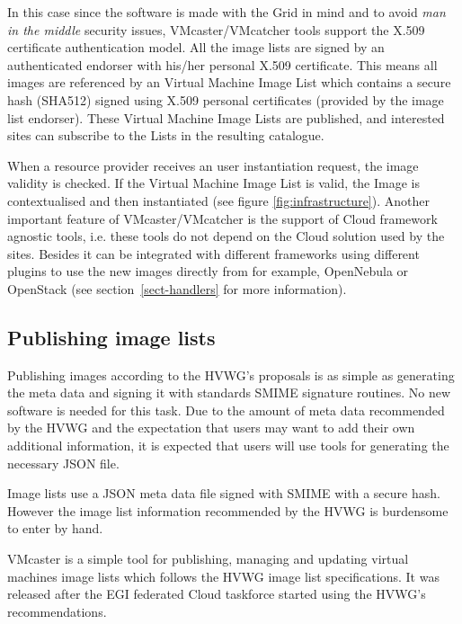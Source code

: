 \documentclass{cai}
\begin{document}
In this case since the software is made with the Grid in mind and to avoid {\it man in the middle} security issues, VMcaster/VMcatcher tools support the X.509 certificate authentication model.
All the image lists are signed by an authenticated endorser with his/her personal X.509 certificate. 
This means all images are referenced by an Virtual Machine Image List which contains a secure hash (SHA512) signed using X.509 personal certificates (provided by the image list endorser). 
These Virtual Machine Image Lists are published, and interested sites can subscribe to the Lists in the resulting catalogue. 

When a resource provider receives an user instantiation request, the image validity is checked. If the Virtual Machine Image List is valid, the Image is contextualised and then instantiated (see figure \ref{fig:infrastructure}). 
Another important feature of VMcaster/VMcatcher is the support of Cloud framework agnostic tools, i.e. these tools do not depend on the Cloud solution used by the sites. Besides it can be integrated with different frameworks using different plugins to use the new images directly from for example, OpenNebula or OpenStack (see section~\ref{sect-handlers} for more information).



\subsection{Publishing image lists}
Publishing images according to the HVWG's proposals is as simple as generating the meta data and signing it with standards SMIME signature routines. No new software is needed for this task. Due to the amount of meta data recommended by the HVWG and the expectation that users may want to add their own additional information, it is expected that users will use tools for generating the necessary JSON file.

Image lists use a JSON meta data file signed with SMIME  with a secure hash. However the image list information recommended by the HVWG is burdensome to enter by hand.
 
VMcaster is a simple tool for publishing, managing and updating virtual machines image lists which follows the HVWG image list specifications. It was released after the EGI federated Cloud taskforce started using the HVWG's recommendations. 
\end{document}
